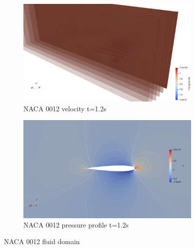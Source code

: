 \begin{figure}[htbp!]
	\centering
	\begin{subfigure}{.75\textwidth}
		\centering
		\includegraphics[width=.99\linewidth]{images/heathcote/naca0012_U.png}
		\caption{NACA 0012 velocity t=1.2s}
	\end{subfigure}
	\newline
	
	\centering
	\begin{subfigure}{.75\textwidth}
		\centering
		\includegraphics[width=.99\linewidth]{images/heathcote/naca0012_p.png}
		\caption{NACA 0012 pressure profile t=1.2s}
	\end{subfigure}
	\caption{NACA 0012 fluid domain}
	\label{fig:hc-fluid-sol}
\end{figure}



